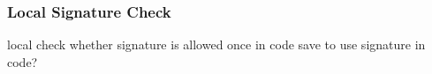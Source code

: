 \subsubsection{Local Signature Check}\label{subsubsection:counter-tampering-signature-local}
local check whether signature is allowed\newline
once in code \newline
save to use signature in code?\newline


